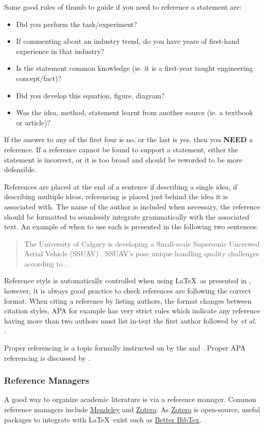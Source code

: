 \noindent
Some good rules of thumb to guide if you need to reference a statement are: 
\begin{itemize}
	\item Did you perform the task/experiment?
	\item If commenting about an industry trend, do you have years of first-hand experience in that industry?
	\item Is the statement common knowledge (ie. it is a first-year taught engineering concept/fact)?
	\item Did you develop this equation, figure, diagram? 
	\item Was the idea, method, statement learnt from another source (ie. a textbook or article)?
\end{itemize}
\noindent
If the answer to any of the first four is no, or the last is yes, then you \textbf{NEED} a reference. 
If a reference cannot be found to support a statement, either the statement is incorrect, or it is too broad and should be reworded to be more defensible. 

References are placed at the end of a sentence if describing a single idea, if describing multiple ideas, referencing is placed just behind the idea it is associated with. The name of the author is included when necessary, the reference should be formatted to seamlessly integrate grammatically with the associated text. 
An example of when to use each is presented in the following two sentences:

\begin{quotation}
	\noindent 
	The University of Calgary is developing a Small-scale Supersonic Uncrewed Aerial Vehicle (SSUAV) \cite{BenConference}. SSUAV's pose unique handling quality challenges according to \citeauthor{BenConference} \cite{BenConference}.
\end{quotation}


\noindent 
Reference style is automatically controlled when using \LaTeX\ as presented in , however, it is always good practice to check references are following the correct format. When citing a reference by listing authors, the format changes between citation styles, APA for example has very strict rules which indicate any reference having more than two authors must list in-text the first author followed by \textit{et al.} \cite{apa}.

Proper referencing is a topic formally instructed on by the \citeauthor{writingUofC} \cite{writingUofC} and \citeauthor{writingCoursesUofC} \cite{writingCoursesUofC}. 
Proper APA referencing is discussed by \citeauthor{apa} \cite{apa}. 

\subsubsection{Reference Managers}
A good way to organize academic literature is via a reference manager. 
Common reference managers include \href{https://www.mendeley.com/}{Mendeley} and \href{https://www.zotero.org/}{Zotero}. 
As \href{https://www.zotero.org/}{Zotero} is open-source, useful packages to integrate with \LaTeX\ exist such as \href{https://retorque.re/zotero-better-bibtex/}{Better BibTex}. 